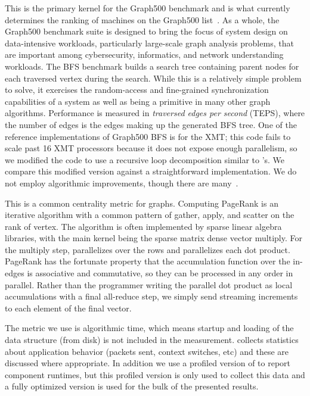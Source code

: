 \vspace{0.5ex}
 This is the primary kernel for the
Graph500 benchmark and is what currently determines the ranking of machines on
the Graph500 list~\cite{graph500list}. As a whole, the Graph500 benchmark
suite is designed to bring the focus of system design on data-intensive
workloads, particularly large-scale graph analysis problems, that are
important among cybersecurity, informatics, and network understanding
workloads. The BFS benchmark builds a search tree containing parent nodes for
each traversed vertex during the search. While this is a relatively simple
problem to solve, it exercises the random-access and fine-grained
synchronization capabilities of a system as well as being a primitive in many
other graph algorithms. Performance is measured in \emph{traversed edges per
second\/} (TEPS), where the number of edges is the edges making up the
generated BFS tree. One of the reference implementations of Graph500 BFS is
for the XMT; this code fails to scale past 16 XMT processors because it does
not expose enough parallelism, so we modified the code to use a recursive loop
decomposition similar to \Grappa's. We compare this modified version against a
straightforward \Grappa implementation. We do not employ algorithmic
improvements, though there are
many~\cite{Beamer:Graph500,Yoo:FixedPointGraph500}.

\vspace{0.5ex}
 

\vspace{0.5ex}
 This is a common centrality metric for
graphs. Computing PageRank is an iterative algorithm with a common
pattern of gather, apply, and scatter on the rank of vertex. The algorithm
is often implemented by sparse linear algebra libraries, with the main
kernel being the sparse matrix dense vector multiply. For the multiply
step, \Grappa parallelizes over the rows and parallelizes each dot
product. PageRank has the fortunate property that the accumulation
function over the in-edges is associative and commutative, so they can
be processed in any order in parallel. Rather than the programmer writing the
parallel dot product as local accumulations with a final all-reduce
step, we simply send streaming increments to each element of the final
vector.

The metric we use is algorithmic time, which means startup and loading of the
data structure (from disk) is not included in the measurement. \Grappa
collects statistics about application behavior (packets sent, context
switches, etc) and these are discussed where appropriate. In addition we use a
profiled version of \Grappa to report component runtimes, but this profiled
version is only used to collect this data and a fully optimized version is
used for the bulk of the presented results.

